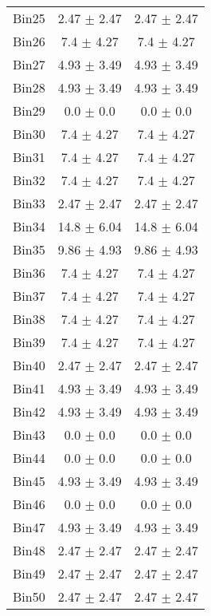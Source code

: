 \begin{tabular}{|c|c|c|}
     Bin25 & 2.47 $\pm$ 2.47 & 2.47 $\pm$ 2.47 \\ \cline{1-3} 
     Bin26 & 7.4 $\pm$ 4.27 & 7.4 $\pm$ 4.27 \\ \cline{1-3} 
     Bin27 & 4.93 $\pm$ 3.49 & 4.93 $\pm$ 3.49 \\ \cline{1-3} 
     Bin28 & 4.93 $\pm$ 3.49 & 4.93 $\pm$ 3.49 \\ \cline{1-3} 
     Bin29 & 0.0 $\pm$ 0.0 & 0.0 $\pm$ 0.0 \\ \cline{1-3} 
     Bin30 & 7.4 $\pm$ 4.27 & 7.4 $\pm$ 4.27 \\ \cline{1-3} 
     Bin31 & 7.4 $\pm$ 4.27 & 7.4 $\pm$ 4.27 \\ \cline{1-3} 
     Bin32 & 7.4 $\pm$ 4.27 & 7.4 $\pm$ 4.27 \\ \cline{1-3} 
     Bin33 & 2.47 $\pm$ 2.47 & 2.47 $\pm$ 2.47 \\ \cline{1-3} 
     Bin34 & 14.8 $\pm$ 6.04 & 14.8 $\pm$ 6.04 \\ \cline{1-3} 
     Bin35 & 9.86 $\pm$ 4.93 & 9.86 $\pm$ 4.93 \\ \cline{1-3} 
     Bin36 & 7.4 $\pm$ 4.27 & 7.4 $\pm$ 4.27 \\ \cline{1-3} 
     Bin37 & 7.4 $\pm$ 4.27 & 7.4 $\pm$ 4.27 \\ \cline{1-3} 
     Bin38 & 7.4 $\pm$ 4.27 & 7.4 $\pm$ 4.27 \\ \cline{1-3} 
     Bin39 & 7.4 $\pm$ 4.27 & 7.4 $\pm$ 4.27 \\ \cline{1-3} 
     Bin40 & 2.47 $\pm$ 2.47 & 2.47 $\pm$ 2.47 \\ \cline{1-3} 
     Bin41 & 4.93 $\pm$ 3.49 & 4.93 $\pm$ 3.49 \\ \cline{1-3} 
     Bin42 & 4.93 $\pm$ 3.49 & 4.93 $\pm$ 3.49 \\ \cline{1-3} 
     Bin43 & 0.0 $\pm$ 0.0 & 0.0 $\pm$ 0.0 \\ \cline{1-3} 
     Bin44 & 0.0 $\pm$ 0.0 & 0.0 $\pm$ 0.0 \\ \cline{1-3} 
     Bin45 & 4.93 $\pm$ 3.49 & 4.93 $\pm$ 3.49 \\ \cline{1-3} 
     Bin46 & 0.0 $\pm$ 0.0 & 0.0 $\pm$ 0.0 \\ \cline{1-3} 
     Bin47 & 4.93 $\pm$ 3.49 & 4.93 $\pm$ 3.49 \\ \cline{1-3} 
     Bin48 & 2.47 $\pm$ 2.47 & 2.47 $\pm$ 2.47 \\ \cline{1-3} 
     Bin49 & 2.47 $\pm$ 2.47 & 2.47 $\pm$ 2.47 \\ \cline{1-3} 
     Bin50 & 2.47 $\pm$ 2.47 & 2.47 $\pm$ 2.47 \\ \cline{1-3} 

\end{tabular}
